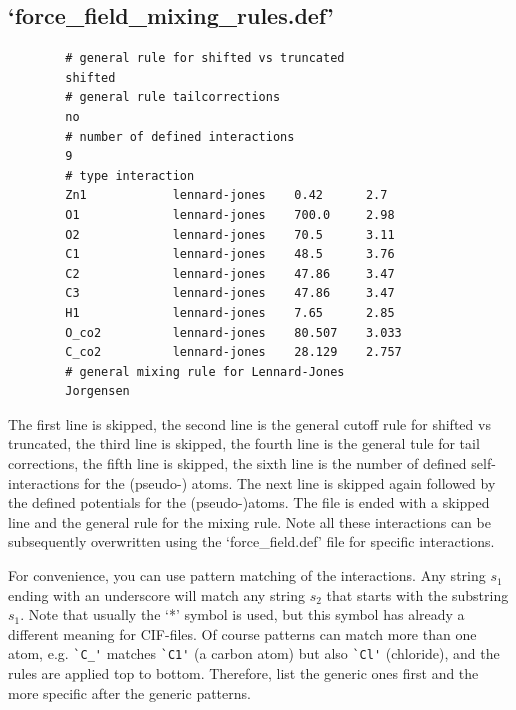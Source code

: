 \subsection{`force\_field\_mixing\_rules.def'}
\begin{verbatim}
        # general rule for shifted vs truncated
        shifted
        # general rule tailcorrections
        no
        # number of defined interactions
        9
        # type interaction
        Zn1            lennard-jones    0.42      2.7
        O1             lennard-jones    700.0     2.98
        O2             lennard-jones    70.5      3.11
        C1             lennard-jones    48.5      3.76
        C2             lennard-jones    47.86     3.47
        C3             lennard-jones    47.86     3.47
        H1             lennard-jones    7.65      2.85
        O_co2          lennard-jones    80.507    3.033
        C_co2          lennard-jones    28.129    2.757
        # general mixing rule for Lennard-Jones
        Jorgensen
\end{verbatim}
The first line is skipped, the second line is the general cutoff rule for shifted vs truncated, the third line is skipped, 
the fourth line is the general tule for tail corrections, the fifth line is skipped, the sixth line is the number of
defined self-interactions for the (pseudo-) atoms. The next line is skipped again followed by the defined potentials
for the (pseudo-)atoms. The file is ended with a skipped line and the general rule for the mixing rule. Note all these
interactions can be subsequently overwritten using the `force\_field.def' file for specific interactions.

For convenience, you can use pattern matching of the interactions. Any string $s_1$ ending with an underscore will match 
any string $s_2$ that starts with the substring $s_1$. Note that usually the `*' symbol is used, but this symbol has already a different
meaning for CIF-files. Of course patterns can match more than one atom, e.g. \verb=`C_'= matches \verb=`C1'= (a carbon atom) but also 
\verb=`Cl'= (chloride), and the rules are applied top to bottom. Therefore, list the generic ones first and the more specific after the generic patterns.

